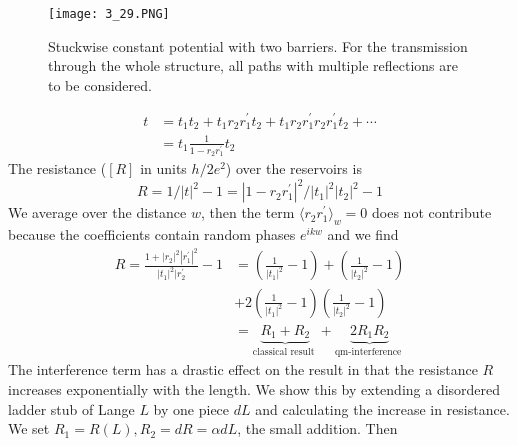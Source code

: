 \begin{figure}[ht]
    \begin{minipage}{0.5\textwidth}
        \centering
        \texttt{[image: 3\_29.PNG]}
    \end{minipage}
    \begin{minipage}{0.5\textwidth}
        \caption{Stuckwise constant potential with two barriers. For the transmission through the whole structure, all paths with multiple reflections are to be considered.}
    \end{minipage}
\end{figure}
\begin{equation}
\begin{aligned} t &=t_{1} t_{2}+t_{1} r_{2} r_{1}^{\prime} t_{2}+t_{1} r_{2} r_{1}^{\prime} r_{2} r_{1}^{\prime} t_{2}+\cdots \\ &=t_{1} \frac{1}{1-r_{2} r_{1}^{\prime}} t_{2} \end{aligned}
\end{equation}
The resistance ($[R]$ in units $h / 2e^2$) over the reservoirs is
\begin{equation}
    R=1 /|t|^{2}-1=\left|1-r_{2} r_{1}^{\prime}\right|^{2} /\left|t_{1}\right|^{2}\left|t_{2}\right|^{2}-1
    \end{equation}
We average over the distance $w$, then the term $\langle r_2 r_1^{\prime}\rangle_w=0$ does not contribute because the coefficients contain random phases $e^{ikw}$ and we find
\begin{equation}
\begin{aligned} R=\frac{1+\left|r_{2}\right|^{2}\left|r_{1}^{\prime}\right|^{2}}{\left|t_{1}\right|^{2} | r_{2}^{\prime}}-1 &=\left(\frac{1}{\left|t_{1}\right|^{2}}-1\right)+\left(\frac{1}{\left|t_{2}\right|^{2}}-1\right) \\ &+2\left(\frac{1}{\left|t_{1}\right|^{2}}-1\right)\left(\frac{1}{\left|t_{2}\right|^{2}}-1\right) \\ &=\underbrace{R_{1}+R_{2}}_{\text {classical result }}+\underbrace{2 R_{1} R_{2}}_{\text {qm-interference }} \end{aligned}
\end{equation}
The interference term has a drastic effect on the result in that the resistance $R$ increases exponentially with the length. We show this by extending a disordered ladder stub of Lange $L$ by one piece $dL$ and calculating the increase in resistance. We set $R_1 = R (L), R_2 = dR = \alpha dL$, the small addition. Then

